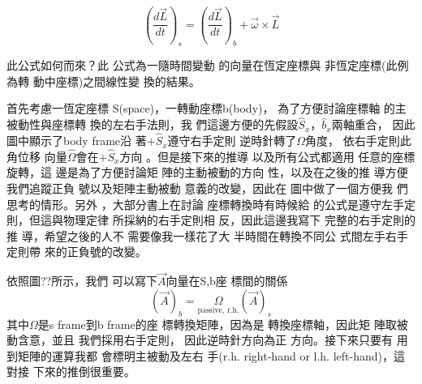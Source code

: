 \documentclass[12pt,a4paper]{article}
\begin{document}
\begin{equation}
\left( \frac{d\vec{L}}{dt}\right) _{s}=\left( \frac{d\vec{L}}{dt}\right)
_{b}+\vec{\omega}\times \vec{L}
\end{equation}

此公式如何而來？此%
公式為一隨時間變動%
的向量在恆定座標與%
非恆定座標(此例為轉%
動中座標)之間線性變%
換的結果。

\begin{figure}[th]
\caption{}
\begin{center}
\end{center}
\end{figure}
\bigskip 

首先考慮一恆定座標%
S(space)，一轉動座標b(body)，%
為了方便討論座標軸%
的主被動性與座標轉%
換的左右手法則，我%
們這邊方便的先假設$%
\hat{S}_{x}， \hat{b}_{x}$兩軸重合，%
因此圖中顯示了body frame沿%
著$+\hat{S}_{x}$遵守右手定則%
逆時針轉了$\Omega $角度，%
依右手定則此角位移%
向量$\hat{\Omega}$會在$+\hat{S}_{x}$方向%
。但是接下來的推導%
以及所有公式都適用%
任意的座標旋轉，這%
邊是為了方便討論矩%
陣的主動被動的方向%
性，以及在之後的推%
導方便我們追蹤正負%
號以及矩陣主動被動%
意義的改變，因此在%
圖中做了一個方便我%
們思考的情形。另外%
，大部分書上在討論%
座標轉換時有時候給%
的公式是遵守左手定%
則，但這與物理定律%
所採納的右手定則相%
反，因此這邊我寫下%
完整的右手定則的推%
導，希望之後的人不%
需要像我一樣花了大%
半時間在轉換不同公%
式間左手右手定則帶%
來的正負號的改變。

\bigskip 依照圖??所示，我們%
可以寫下$\vec{A}$向量在S,b座%
標間的關係%
\begin{equation*}
\left( \vec{A}\right) _{b}=\underset{\text{passive, r.h.}}{\Omega }\left( 
\vec{A}\right) _{s}
\end{equation*}%
其中$\Omega $是s frame到b frame的座%
標轉換矩陣，因為是%
轉換座標軸，因此矩%
陣取被動含意，並且%
我們採用右手定則，%
因此逆時針方向為正%
方向。接下來只要有%
用到矩陣的運算我都%
會標明主被動及左右%
手(r.h. right-hand or l.h. left-hand)，這對接%
下來的推倒很重要。
\end{document}
